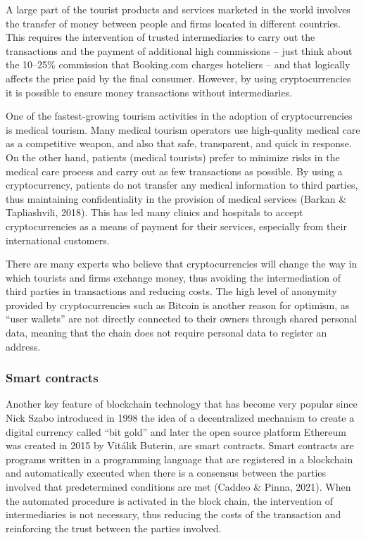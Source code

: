 \documentclass[
  letterpaper,
  DIV=11,
  numbers=noendperiod]{scrreprt}
\begin{document}
A large part of the tourist products and services marketed in the world
involves the transfer of money between people and firms located in
different countries. This requires the intervention of trusted
intermediaries to carry out the transactions and the payment of
additional high commissions -- just think about the 10--25\% commission
that Booking.com charges hoteliers -- and that logically affects the
price paid by the final consumer. However, by using cryptocurrencies it
is possible to ensure money transactions without intermediaries.

One of the fastest-growing tourism activities in the adoption of
cryptocurrencies is medical tourism. Many medical tourism operators use
high-quality medical care as a competitive weapon, and also that safe,
transparent, and quick in response. On the other hand, patients (medical
tourists) prefer to minimize risks in the medical care process and carry
out as few transactions as possible. By using a cryptocurrency, patients
do not transfer any medical information to third parties, thus
maintaining confidentiality in the provision of medical services (Barkan
\& Tapliashvili, 2018). This has led many clinics and hospitals to
accept cryptocurrencies as a means of payment for their services,
especially from their international customers.

There are many experts who believe that cryptocurrencies will change the
way in which tourists and firms exchange money, thus avoiding the
intermediation of third parties in transactions and reducing costs. The
high level of anonymity provided by cryptocurrencies such as Bitcoin is
another reason for optimism, as ``user wallets'' are not directly
connected to their owners through shared personal data, meaning that the
chain does not require personal data to register an address.

\hypertarget{smart-contracts}{%
\subsubsection{Smart contracts}\label{smart-contracts}}

Another key feature of blockchain technology that has become very
popular since Nick Szabo introduced in 1998 the idea of a decentralized
mechanism to create a digital currency called ``bit gold'' and later the
open source platform Ethereum was created in 2015 by Vitálik Buterin,
are smart contracts. Smart contracts are programs written in a
programming language that are registered in a blockchain and
automatically executed when there is a consensus between the parties
involved that predetermined conditions are met (Caddeo \& Pinna, 2021).
When the automated procedure is activated in the block chain, the
intervention of intermediaries is not necessary, thus reducing the costs
of the transaction and reinforcing the trust between the parties
involved.
\end{document}
